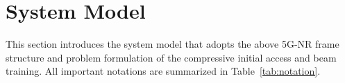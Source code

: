 \documentclass[journal]{IEEEtran}
\begin{document}
%
%
\section{System Model}
\label{sec:system_model}

This section introduces the system model that adopts the above 5G-NR frame structure and problem formulation of the compressive initial access and beam training. \color{black}All important notations are summarized in Table~\ref{tab:notation}. \color{black}
\end{document}
